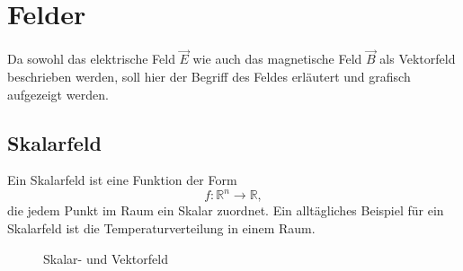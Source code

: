 %
%
%
%
\section{Felder\label{maxwell:mathFormulierung}}

Da sowohl das elektrische Feld $\vec{E}$ wie auch das magnetische Feld $\vec{B}$ als Vektorfeld beschrieben werden, soll hier der Begriff des Feldes erläutert und grafisch aufgezeigt werden.

\subsection{Skalarfeld\label{maxwell:skalarfeld}}

Ein Skalarfeld ist eine Funktion der Form
\[ f:\mathbb{R}^n \rightarrow \mathbb{R}, \] 
die jedem Punkt im Raum ein Skalar zuordnet.
Ein alltägliches Beispiel für ein Skalarfeld ist die Temperaturverteilung in einem Raum.



\begin{figure}
	\centering
	\caption{Skalar- und Vektorfeld}
	\label{maxwell:skalarGrad}
\end{figure}

